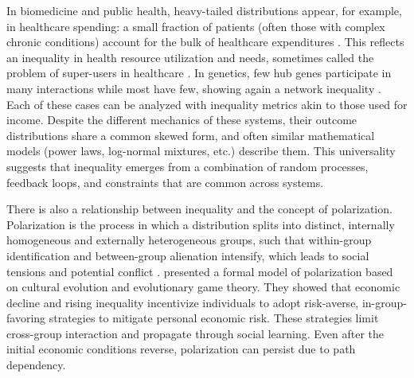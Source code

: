 \documentclass[11pt]{article}
\begin{document}
In biomedicine and public health, heavy-tailed distributions appear, for example, in healthcare spending: a small fraction of patients (often those with complex chronic conditions) account for the bulk of healthcare expenditures \citep{berk2001concentration}. This reflects an inequality in health resource utilization and needs, sometimes called the problem of super-users in healthcare \citep{yuan2015mixed}. In genetics, few hub genes participate in many interactions while most have few, showing again a network inequality \citep{boucher2013genetic}. Each of these cases can be analyzed with inequality metrics akin to those used for income. Despite the different mechanics of these systems, their outcome distributions share a common skewed form, and often similar mathematical models (power laws, log-normal mixtures, etc.) describe them. This universality suggests that inequality emerges from a combination of random processes, feedback loops, and constraints that are common across systems.

There is also a relationship between inequality and the concept of polarization. Polarization is the process in which a distribution splits into distinct, internally homogeneous and externally heterogeneous groups, such that within-group identification and between-group alienation intensify, which leads to social tensions and potential conflict \citep{esteban1994polarization}. \citet{stewart2020polarization} presented a formal model of polarization based on cultural evolution and evolutionary game theory. They showed that economic decline and rising inequality incentivize individuals to adopt risk-averse, in-group-favoring strategies to mitigate personal economic risk. These strategies limit cross-group interaction and propagate through social learning. Even after the initial economic conditions reverse, polarization can persist due to path dependency. 
\end{document}
